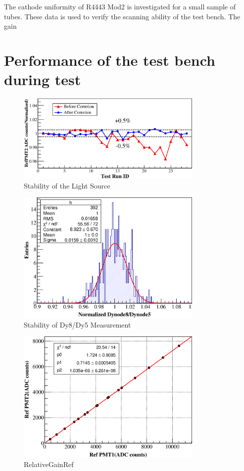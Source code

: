 \documentclass[5p, times]{elsarticle}
\begin{document}
The cathode uniformity of R4443 Mod2 is investigated for a small sample of tubes.
These data is used to verify the scanning ability of the test bench.
The gain


\section{Performance of the test bench during test}
\label{sec:performance}

\begin{figure}[h!]
 \centering
 \includegraphics[width=90mm]{led_stability}
\caption{Stability of the Light Source}
\label{fig:led_stability}
\end{figure} 

\begin{figure}[h!]
 \centering
 \includegraphics[width=90mm]{RefDy58Dist}
\caption{Stability of Dy8/Dy5 Measurement}
\label{fig:dy58_stabiltiy}
\end{figure} 

\begin{figure}[h!]
 \centering
 \includegraphics[width=90mm]{RelativeGainRef}
\caption{RelativeGainRef}
\label{fig:refgain_relation}
\end{figure} 
\end{document}
